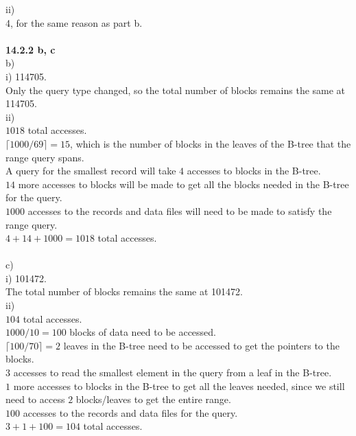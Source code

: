 \documentclass[12pt, letterpaper, fleqn]{article}
\begin{document}
  ii) \\
  4, for the same reason as part b. \\\\

  \textbf{14.2.2 b, c}\\
  b) \\
  i) 114705. \\
  Only the query type changed, so the total number of blocks remains the same
  at 114705.\\
  ii) \\
  $1018$ total accesses.\\
  $\lceil 1000 / 69 \rceil = 15$, which is the number of blocks in the leaves of
  the B-tree that the range
  query spans. \\
  A query for the smallest record will take $4$ accesses to blocks in the
  B-tree. \\
  $14$ more accesses to blocks will be made to get all the blocks needed in the
  B-tree for the query. \\
  $1000$ accesses to the records and data files will need to be made to satisfy
  the range query.\\
  $4 + 14 + 1000 = 1018$ total accesses.\\\\

  c)\\
  i) 101472. \\
  The total number of blocks remains the same at 101472.\\
  ii) \\
  $104$ total accesses. \\
  $1000 / 10 = 100$ blocks of data need to be accessed. \\
  $\lceil 100 / 70 \rceil = 2$ leaves in the B-tree need to be accessed to get
  the pointers to the blocks.\\
  $3$ accesses to read the smallest element in the query from a leaf in the
  B-tree. \\
  $1$ more accesses to blocks in the B-tree to get all the leaves needed, since
  we still need to access $2$ blocks/leaves to get the entire range.\\
  $100$ accesses to the records and data files for the query. \\
  $3  + 1  + 100 = 104$ total accesses. \\\\
\end{document}
